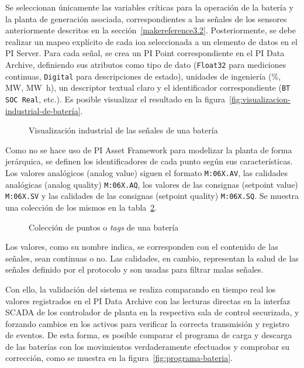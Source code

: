 Se seleccionan únicamente las variables críticas para la operación de la batería y la planta de generación asociada, correspondientes a las señales de los sensores anteriormente descritos en la sección~\ref{makereference3.2}. Posteriormente, se debe realizar un mapeo explícito de cada \gls{ioa} seleccionada a un elemento de datos en el PI Server. Para cada señal, se crea un PI Point correspondiente en el PI Data Archive, definiendo sus atributos como tipo de dato (\texttt{Float32} para mediciones continuas, \texttt{Digital} para descripciones de estado), unidades de ingeniería (\si{\percent}, \si{\mega\watt}, \si{\mega\watt\hour}), un descriptor textual claro y el identificador correspondiente (\texttt{BT SOC Real}, etc.). Es posible visualizar el resultado en la figura~\ref{fig:visualizacion-industrial-de-batería}.

\begin{figure}
  \centering
  \caption{Visualización industrial de las señales de una batería}
  \label{fig:visualizacion-industrial-de-bateria}
\end{figure}

Como no se hace uso de PI Asset Framework para modelizar la planta de forma jerárquica, se definen los identificadores de cada punto según sus características. Los valores analógicos (analog value) siguen el formato \texttt{M:06X.AV}, las calidades analógicas (analog quality) \texttt{M:06X.AQ}, los valores de las consignas (setpoint value) \texttt{M:06X.SV} y las calidades de las consignas (setpoint quality) \texttt{M:06X.SQ}. Se muestra una colección de los mismos en la tabla~\ref{fig:puntos-bateria}.

\begin{figure}
  \centering
  \caption{Colección de puntos o \textit{tags} de una batería}
  \label{fig:puntos-bateria}
\end{figure}

Los valores, como su nombre indica, se corresponden con el contenido de las señales, sean continuas o no. Las calidades, en cambio, representan la salud de las señales definido por el protocolo y son usadas para filtrar malas señales.

Con ello, la validación del sistema se realiza comparando en tiempo real los valores registrados en el PI Data Archive con las lecturas directas en la interfaz SCADA de los controlador de planta en la respectiva sala de control securizada, y forzando cambios en los activos para verificar la correcta transmisión y registro de eventos. De esta forma, es posible comparar el programa de carga y descarga de las baterías con los movimientos verdaderamente efectuados y comprobar su corrección, como se muestra en la figura~\ref{fig:programa-bateria}.

